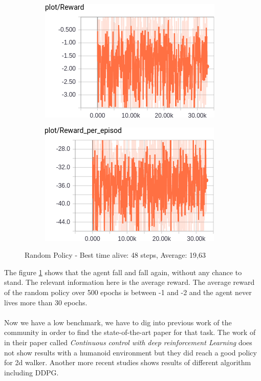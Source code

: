 \documentclass{article}
\begin{document}
\begin{figure}[ht]
  \centering
  \begin{subfigure}[b]{.4\textwidth}
    \centering
    \includegraphics[width=.9\textwidth]{benchmark30K_reward}
  \end{subfigure}
  \begin{subfigure}[b]{.4\textwidth}
    \centering
    \includegraphics[width=.9\textwidth]{benchmark30K_reward_per_ep}
  \end{subfigure}
  \caption{Random Policy - Best time alive: 48 steps, Average: 19,63}
  \label{fig:randompolicy}
\end{figure}

The figure \ref{fig:randompolicy} shows that the agent fall and fall again,
without any chance to stand. The relevant information here is the average
reward. The average reward of the random policy over 500 epochs is between -1
and -2 and the agent never lives more than 30 epochs.
\paragraph{}
Now we have a low benchmark, we have to dig into previous work of the community
in order to find the state-of-the-art paper for that task. The work of
\citeauthor{journals/corr/LillicrapHPHETS15} in their paper called
\textit{Continuous control with deep reinforcement Learning} does not show
results with a humanoid environment but they did reach a good policy for 2d
walker. Another more recent studies\cite{GuLilGhaTurLev17} shows results of
different algorithm including DDPG. 
\end{document}
